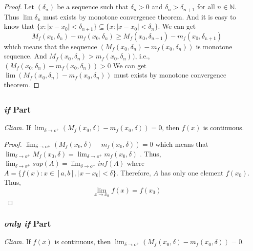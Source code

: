 \documentclass{article}
\begin{document}
    \section{}
        \subsection{}
            \begin{proof}
                Let $(\delta_n)$ be a sequence such that $\delta_n>0$ and $\delta_n>\delta_{n+1}$ for all $n\in\mathbb{N}$.
                Thus $\lim \delta_n$ must exists by monotone convergence theorem.
                And it is easy to know that $\{x:|x-x_0 |<\delta_{n+1}\}\subseteq\{x:|x-x_0 |<\delta_n\} $.
                We can get
                $$M_f(x_0,\delta_n)-m_f(x_0,\delta_n)\geq M_f(x_0,\delta_{n+1})-m_f(x_0,\delta_{n+1})$$
                which means that the sequence $(M_f(x_0,\delta_n)-m_f(x_0,\delta_n))$ is monotone sequence.
                And $M_f(x_0,\delta_n)>m_f(x_0,\delta_n))$, i.e., $(M_f(x_0,\delta_n)-m_f(x_0,\delta_n))>0$
                We can get $\lim (M_f(x_0,\delta_n)-m_f(x_0,\delta_n))$ must exists by monotone convergence theorem.
            \end{proof}
                
            
        \subsection{}
            \subsubsection*{\textit{if} Part}
            \textit{Cliam.} If $\lim_{\delta\rightarrow o^+}(M_f(x_0,\delta)-m_f(x_0,\delta))=0$, then $f(x)$ is continuous.
            \begin{proof}
                $\lim_{\delta\rightarrow o^+}(M_f(x_0,\delta)-m_f(x_0,\delta))=0$ which means that \\$\lim_{\delta\rightarrow o^+}M_f(x_0,\delta)=\lim_{\delta\rightarrow o^+}m_f(x_0,\delta)$ . Thus, $\lim_{\delta\rightarrow o^+}sup(A)=\lim_{\delta\rightarrow o^+}inf(A)$ where $A=\{f(x):x\in[a,b],|x-x_0|<\delta\}$. Therefore, $A$ has only one element $f(x_0)$.
                Thus, $$\lim_{x\rightarrow x_0}f(x)=f(x_0)$$
            \end{proof}

            \subsubsection*{\textit{only if} Part}
            \textit{Cliam.} If $f(x)$ is continuous, then $\lim_{\delta\rightarrow o^+}(M_f(x_0,\delta)-m_f(x_0,\delta))=0$.
\end{document}
